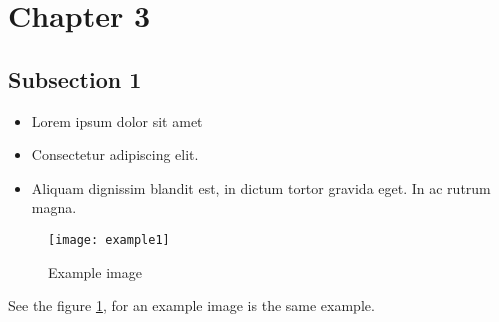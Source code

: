 \section{Chapter 3}

\lipsum[4]


\subsection{Subsection 1}

\begin{itemize}
\item Lorem ipsum dolor sit amet\cite{example}
\item Consectetur adipiscing elit. 
\item Aliquam dignissim blandit est, in dictum tortor gravida eget. In ac rutrum magna.
\end{itemize}

\begin{figure}[h]
\centering
\texttt{[image: example1]}
\caption{Example image}
\label{fig:image1}
\end{figure}

See the figure \ref{fig:image1}, for an example image \pageref{fig:image1} is the same example.
